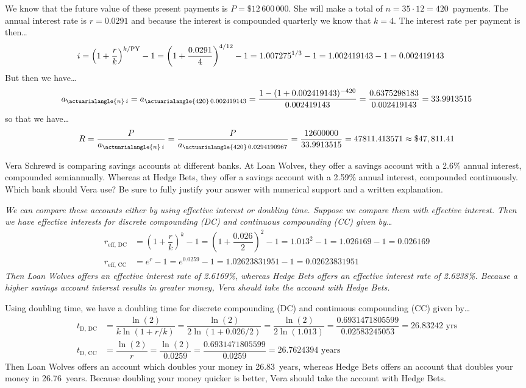 \documentclass[12pt,letterpaper]{exam}
\begin{document}
\begin{questions}
{We know that the future value of these present payments is $P= \$12\,600\,000$. She will make a total of $n= 35 \cdot 12= 420$~payments. The annual interest rate is $r= 0.0291$ and because the interest is compounded quarterly we know that $k= 4$. The interest rate per payment is then\dots
	\[
	\hspace{-0.5cm} i= \left(1 + \dfrac{r}{k} \right)^{k/\text{PY}} - 1= \left(1 + \dfrac{0.0291}{4} \right)^{4/12} - 1= 1.007275^{1/3} - 1= 1.002419143 - 1= 0.002419143
	\]
But then we have\dots
	\[
	a_{\actuarialangle{n}\,i}= a_{\actuarialangle{420}\,0.002419143}= \dfrac{1 - (1 + 0.002419143)^{-420}}{0.002419143}= \dfrac{0.6375298183}{0.002419143}= 33.9913515
	\]
so that we have\dots
	\[
	R= \dfrac{P}{a_{\actuarialangle{n}\,i}}= \dfrac{P}{a_{\actuarialangle{420}\,0.0294190967}}= \dfrac{12600000}{33.9913515}= 47811.413571 \approx \$47,811.41
	\]
}



\newpage
\question[10] Vera Schrewd is comparing savings accounts at different banks. At Loan Wolves, they offer a savings account with a 2.6\% annual interest, compounded semiannually. Whereas at Hedge Bets, they offer a savings account with a 2.59\% annual interest, compounded continuously. Which bank should Vera use? Be sure to fully justify your answer with numerical support and a written explanation. \pspace

{\itshape
\sol We can compare these accounts either by using effective interest or doubling time. Suppose we compare them with effective interest. Then we have effective interests for discrete compounding (DC) and continuous compounding (CC) given by\dots
	\[
	\begin{aligned}
	r_{\text{eff, DC}}&= \left(1 + \dfrac{r}{k} \right)^k - 1= \left(1 + \dfrac{0.026}{2} \right)^2 - 1= 1.013^2 - 1= 1.026169 - 1= 0.026169 \\[0.3cm]
	r_{\text{eff, CC}}&= e^r - 1= e^{0.0259} - 1= 1.02623831951 - 1= 0.02623831951
	\end{aligned}
	\]
Then Loan Wolves offers an effective interest rate of 2.6169\%, whereas Hedge Bets offers an effective interest rate of 2.6238\%. Because a higher savings account interest results in greater money, Vera should take the account with Hedge Bets. \pspace

Using doubling time, we have a doubling time for discrete compounding (DC) and continuous compounding (CC) given by\dots
	\[
	\begin{aligned}
	t_{\text{D, DC}}&= \dfrac{\ln(2)}{k \ln(1 + r/k)}= \dfrac{\ln(2)}{2 \ln(1 + 0.026/2)}= \dfrac{\ln(2)}{2 \ln(1.013)}= \dfrac{0.6931471805599}{0.02583245053}= 26.83242 \text{ yrs} \\[0.3cm]
	t_{\text{D, CC}}&= \dfrac{\ln(2)}{r}= \dfrac{\ln(2)}{0.0259}= \dfrac{0.6931471805599}{0.0259}= 26.7624394 \text{ years}
	\end{aligned}
	\]
Then Loan Wolves offers an account which doubles your money in 26.83~years, whereas Hedge Bets offers an account that doubles your money in 26.76~years. Because doubling your money quicker is better, Vera should take the account with Hedge Bets. 
}




\end{questions}
\end{document}
